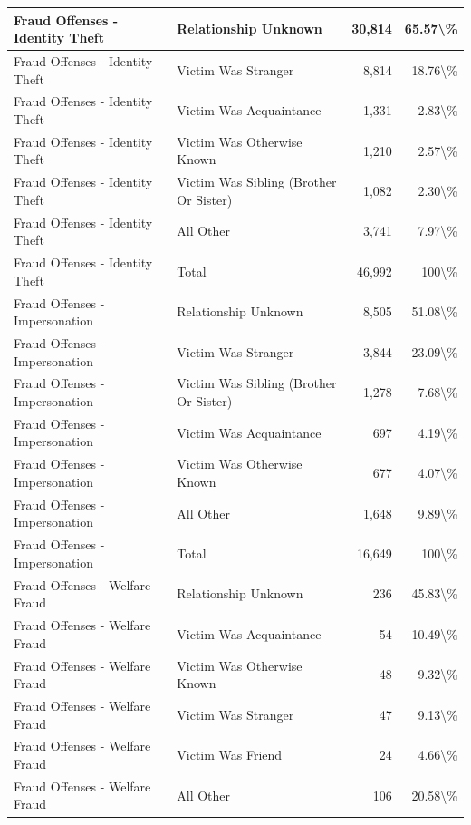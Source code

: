 \documentclass[
]{krantz}
\begin{document}
\begin{longtable}[t]{l|l|r|r}
\hline
Fraud Offenses - Identity Theft & Relationship Unknown & 30,814 & 65.57\textbackslash{}\%\\
\hline
Fraud Offenses - Identity Theft & Victim Was Stranger & 8,814 & 18.76\textbackslash{}\%\\
\hline
Fraud Offenses - Identity Theft & Victim Was Acquaintance & 1,331 & 2.83\textbackslash{}\%\\
\hline
Fraud Offenses - Identity Theft & Victim Was Otherwise Known & 1,210 & 2.57\textbackslash{}\%\\
\hline
Fraud Offenses - Identity Theft & Victim Was Sibling (Brother Or Sister) & 1,082 & 2.30\textbackslash{}\%\\
\hline
Fraud Offenses - Identity Theft & All Other & 3,741 & 7.97\textbackslash{}\%\\
\hline
Fraud Offenses - Identity Theft & Total & 46,992 & 100\textbackslash{}\%\\
\hline
Fraud Offenses - Impersonation & Relationship Unknown & 8,505 & 51.08\textbackslash{}\%\\
\hline
Fraud Offenses - Impersonation & Victim Was Stranger & 3,844 & 23.09\textbackslash{}\%\\
\hline
Fraud Offenses - Impersonation & Victim Was Sibling (Brother Or Sister) & 1,278 & 7.68\textbackslash{}\%\\
\hline
Fraud Offenses - Impersonation & Victim Was Acquaintance & 697 & 4.19\textbackslash{}\%\\
\hline
Fraud Offenses - Impersonation & Victim Was Otherwise Known & 677 & 4.07\textbackslash{}\%\\
\hline
Fraud Offenses - Impersonation & All Other & 1,648 & 9.89\textbackslash{}\%\\
\hline
Fraud Offenses - Impersonation & Total & 16,649 & 100\textbackslash{}\%\\
\hline
Fraud Offenses - Welfare Fraud & Relationship Unknown & 236 & 45.83\textbackslash{}\%\\
\hline
Fraud Offenses - Welfare Fraud & Victim Was Acquaintance & 54 & 10.49\textbackslash{}\%\\
\hline
Fraud Offenses - Welfare Fraud & Victim Was Otherwise Known & 48 & 9.32\textbackslash{}\%\\
\hline
Fraud Offenses - Welfare Fraud & Victim Was Stranger & 47 & 9.13\textbackslash{}\%\\
\hline
Fraud Offenses - Welfare Fraud & Victim Was Friend & 24 & 4.66\textbackslash{}\%\\
\hline
Fraud Offenses - Welfare Fraud & All Other & 106 & 20.58\textbackslash{}\%\\

\end{longtable}
\end{document}
